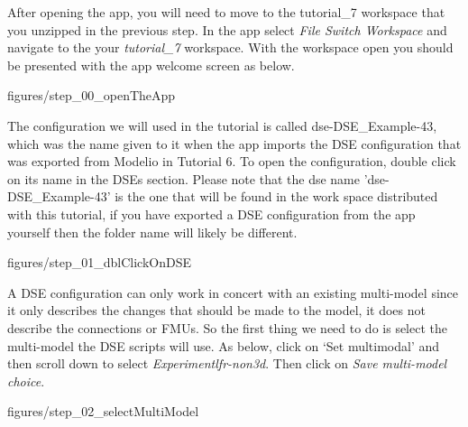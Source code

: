 \documentclass[11pt,a4paper]{../tutorial}
\begin{document}
After opening the app, you will need to move to the tutorial\_7 workspace that you unzipped in the previous step.  In the app select \emph{File \menusep Switch Workspace} and navigate to the your \emph{tutorial\_7} workspace.  With the workspace open you should be presented with the app welcome screen as below.

\begin{center}\begin{annotation}[width=0.7\linewidth,trim=0 0 0 0,clip]{figures/step_00_openTheApp}
\end{annotation}\end{center}

The configuration we will used in the tutorial is called dse-DSE\_Example-43, which was the name given to it when the app imports the DSE configuration that was exported from Modelio in Tutorial 6.  To open the configuration, double click on its name in the DSEs section.  Please note that the dse name 'dse-DSE\_Example-43' is the one that will be found in the work space distributed with this tutorial, if you have exported a DSE configuration from the app yourself  then the folder name will likely be different.


\begin{center}\begin{annotation}[width=0.7\linewidth,trim=0 0 0 0,clip]{figures/step_01_dblClickOnDSE}
\end{annotation}\end{center}

A DSE configuration can only work in concert with an existing multi-model since it only describes the changes that should be made to the model, it does not describe the connections or FMUs.  So the first thing we need to do is select the multi-model the DSE scripts will use.  As below, click on ‘Set multimodal’ and then scroll down to select \emph{Experiment\pathsep{}lfr-non3d}.  Then click on \emph{Save multi-model choice}.


\begin{center}\begin{annotation}[width=0.7\linewidth,trim=0 0 0 0,clip]{figures/step_02_selectMultiModel}
\end{annotation}\end{center}
\end{document}
